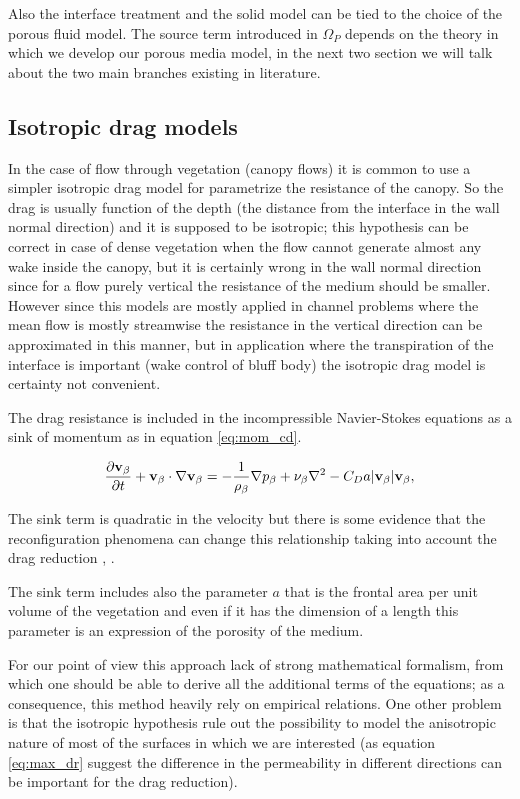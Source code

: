 Also the interface treatment and the solid model can be tied to the choice of the porous fluid model.
The source term introduced in $\Omega_{P}$ depends on the theory in which we develop our porous media model, in the next two section we will talk about the two main branches existing in literature.

\subsection{Isotropic drag models}
\label{sec:canopy_eq}

In the case of flow through vegetation (canopy flows) it is common to use a simpler isotropic drag model for parametrize the resistance of the canopy.
So the drag is usually function of the depth (the distance from the interface in the wall normal direction) and it is supposed to be isotropic; this hypothesis can be correct in case of dense vegetation when the flow cannot generate almost any wake inside the canopy, but it is certainly wrong in the wall normal direction since for a flow purely vertical the resistance of the medium should be smaller.
However since this models are mostly applied in channel problems where the mean flow is mostly streamwise the resistance in the vertical direction can be approximated in this manner, but in application where the transpiration of the interface is important (wake control of bluff body) the isotropic drag model is certainty not convenient.

The drag resistance is included in the incompressible Navier-Stokes equations as a sink of momentum as in equation \ref{eq:mom_cd}.

\begin{equation}
\frac{\partial \textbf{v}_{\beta}}{\partial t} + \textbf{v}_{\beta} \cdot \nabla \textbf{v}_{\beta} = -\frac{1}{\rho_{\beta}} \nabla p_{\beta} + \nu_{\beta} \nabla^2 -C_D a |\textbf{v}_{\beta}| \textbf{v}_{\beta}, 
\label{eq:mom_cd}
\end{equation}

The sink term is quadratic in the velocity but there is some evidence that the reconfiguration phenomena can change this relationship taking into account the drag reduction \cite{gosselin2011drag}, \citet{alvarado2017nature}.

The sink term includes also the parameter $a$ that is the frontal area per unit volume of the vegetation and even if it has the dimension of a length this parameter is an expression of the porosity of the medium.

For our point of view this approach lack of strong mathematical formalism, from which one should be able to derive all the additional terms of the equations; as a consequence, this method heavily rely on empirical relations.
One other problem is that the isotropic hypothesis rule out the possibility to model the anisotropic nature of most of the surfaces in which we are interested (as equation \ref{eq:max_dr} suggest the difference in the permeability in different directions can be important for the drag reduction).

